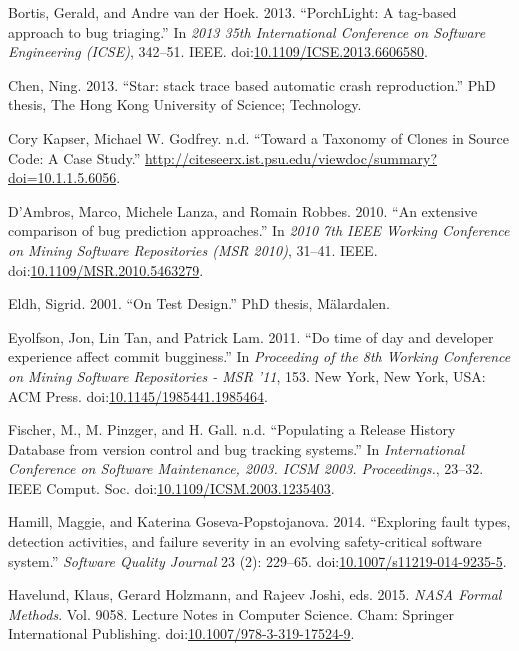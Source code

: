 \documentclass[natbib]{svjour3}
\begin{document}
\hypertarget{ref-Bortis2013}{}
Bortis, Gerald, and Andre van der Hoek. 2013. ``PorchLight: A tag-based
approach to bug triaging.'' In \emph{2013 35th International Conference
on Software Engineering (ICSE)}, 342--51. IEEE.
doi:\href{https://doi.org/10.1109/ICSE.2013.6606580}{10.1109/ICSE.2013.6606580}.

\hypertarget{ref-Chen2013}{}
Chen, Ning. 2013. ``Star: stack trace based automatic crash
reproduction.'' PhD thesis, The Hong Kong University of Science;
Technology.

\hypertarget{ref-CoryKapser}{}
Cory Kapser, Michael W. Godfrey. n.d. ``Toward a Taxonomy of Clones in
Source Code: A Case Study.''
\url{http://citeseerx.ist.psu.edu/viewdoc/summary?doi=10.1.1.5.6056}.

\hypertarget{ref-DAmbros2010}{}
D'Ambros, Marco, Michele Lanza, and Romain Robbes. 2010. ``An extensive
comparison of bug prediction approaches.'' In \emph{2010 7th IEEE
Working Conference on Mining Software Repositories (MSR 2010)}, 31--41.
IEEE.
doi:\href{https://doi.org/10.1109/MSR.2010.5463279}{10.1109/MSR.2010.5463279}.

\hypertarget{ref-Eldh2001}{}
Eldh, Sigrid. 2001. ``On Test Design.'' PhD thesis, Mälardalen.

\hypertarget{ref-Eyolfson2011}{}
Eyolfson, Jon, Lin Tan, and Patrick Lam. 2011. ``Do time of day and
developer experience affect commit bugginess.'' In \emph{Proceeding of
the 8th Working Conference on Mining Software Repositories - MSR '11},
153. New York, New York, USA: ACM Press.
doi:\href{https://doi.org/10.1145/1985441.1985464}{10.1145/1985441.1985464}.

\hypertarget{ref-Fischer}{}
Fischer, M., M. Pinzger, and H. Gall. n.d. ``Populating a Release
History Database from version control and bug tracking systems.'' In
\emph{International Conference on Software Maintenance, 2003. ICSM 2003.
Proceedings.}, 23--32. IEEE Comput. Soc.
doi:\href{https://doi.org/10.1109/ICSM.2003.1235403}{10.1109/ICSM.2003.1235403}.

\hypertarget{ref-Hamill2014}{}
Hamill, Maggie, and Katerina Goseva-Popstojanova. 2014. ``Exploring
fault types, detection activities, and failure severity in an evolving
safety-critical software system.'' \emph{Software Quality Journal} 23
(2): 229--65.
doi:\href{https://doi.org/10.1007/s11219-014-9235-5}{10.1007/s11219-014-9235-5}.

\hypertarget{ref-Havelund2015}{}
Havelund, Klaus, Gerard Holzmann, and Rajeev Joshi, eds. 2015.
\emph{NASA Formal Methods}. Vol. 9058. Lecture Notes in Computer
Science. Cham: Springer International Publishing.
doi:\href{https://doi.org/10.1007/978-3-319-17524-9}{10.1007/978-3-319-17524-9}.
\end{document}
